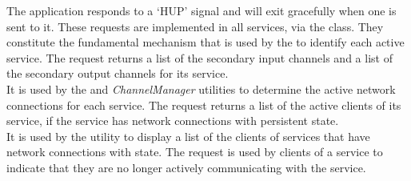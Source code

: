 The  application responds to a `HUP'
signal and will exit gracefully when one is sent to it.
\secondaryEnd{}
These requests are implemented in all \mplusm{} services, via the
 class.
They constitute the fundamental mechanism that is used by the
 to identify each active service.
The  request returns a list of the secondary input
channels and a list of the secondary output channels for its service.\\

It is used by the  and \emph{ChannelManager} utilities to
determine the active \yarp{} network connections for each service.
The  request returns a list of the active clients of
its service, if the service has \yarp{} network connections with persistent state.\\

It is used by the  utility to display a list of the clients
of services that have \yarp{} network connections with state.
The  request is used by clients of a service to
indicate that they are no longer actively communicating with the service.\\

